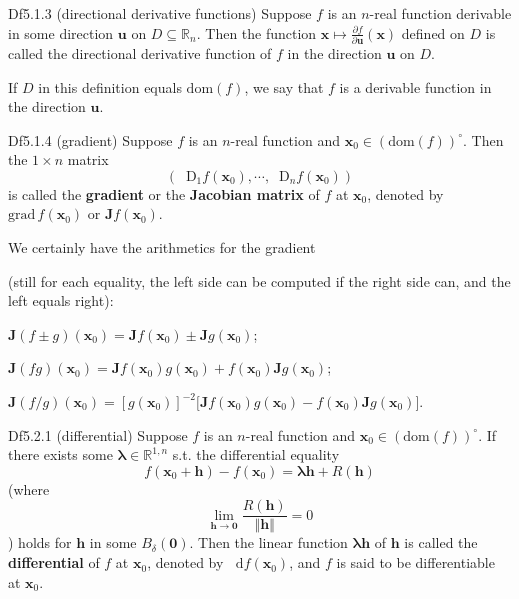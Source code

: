 \documentclass{article}
\newcommand{\parfrac}[2]{\frac{\partial #1}{\partial #2}}
\newcommand{\dif}{\mathop{}\!\mathrm{d}}
\newcommand{\Dif}{\mathop{}\!\mathrm{D}}
\begin{document}
\begin{Df}{Df5.1.3 (directional derivative functions)}
    Suppose $f$ is an $n$-real function derivable in some direction $\pmb{u}$ on $D\subseteq\mathbb{R}_n$. Then the function $\pmb{x}\mapsto \parfrac{f}{\pmb{u}}(\pmb{x})$ defined on $D$ is called the directional derivative function of $f$ in the direction $\pmb{u}$ on $D$.
\end{Df}

\begin{Rmk}{}
    \textcolor{Df}{If $D$ in this definition equals $\text{dom}(f)$, we say that $f$ is a derivable function in the direction $\pmb{u}$.}
\end{Rmk}

\begin{Df}{Df5.1.4 (gradient)}
    Suppose $f$ is an $n$-real function and $\pmb{x}_0\in (\text{dom}(f))^\circ$. Then the $1\times n$ matrix 
    $$(\Dif_1 f(\pmb{x}_0), \cdots, \Dif_n f(\pmb{x}_0))$$
    is called the \textbf{gradient} or the \textbf{Jacobian matrix} of $f$ at $\pmb{x}_0$, denoted by $\text{grad}\,f(\pmb{x}_0)$ or $\pmb{J}f(\pmb{x}_0)$.
\end{Df}

\begin{Rmk}{}
    We certainly have the arithmetics for the gradient \textcolor{Th}{(still for each equality, the left side can be computed if the right side can, and the left equals right): 
    \begin{compactenum}
        \item $\pmb{J}(f\pm g)(\pmb{x}_0) = \pmb{J}f(\pmb{x}_0)\pm\pmb{J}g(\pmb{x}_0)$;
        \item $\pmb{J}(fg)(\pmb{x}_0) = \pmb{J}f(\pmb{x}_0)g(\pmb{x}_0) + f(\pmb{x}_0)\pmb{J}g(\pmb{x}_0)$;
        \item $\pmb{J}(f/g)(\pmb{x}_0) = [g(\pmb{x}_0)]^{-2} \bigl[\pmb{J}f(\pmb{x}_0)g(\pmb{x}_0) - f(\pmb{x}_0)\pmb{J}g(\pmb{x}_0)\bigr]$.
    \end{compactenum}
    }
\end{Rmk}

\begin{Df}{Df5.2.1 (differential)}
    Suppose $f$ is an $n$-real function and $\pmb{x}_0\in (\text{dom}(f))^\circ$. If there exists some $\pmb{\lambda}\in\mathbb{R}^{1,n}$ s.t. the differential equality
    $$ f(\pmb{x}_0 + \pmb{h}) - f(\pmb{x}_0) = \pmb{\lambda}\pmb{h} + R(\pmb{h}) $$
    (where 
    $$\lim_{\pmb{h}\to \pmb{0}}\frac{R(\pmb{h})}{\Vert \pmb{h}\Vert} = 0 $$
    ) holds for $\pmb{h}$ in some $B_\delta(\pmb{0})$. Then the linear function $\pmb{\lambda h}$ of $\pmb{h}$ is called the \textbf{differential} of $f$ at $\pmb{x}_0$, denoted by $\dif f(\pmb{x}_0)$, and $f$ is said to be differentiable at $\pmb{x}_0$.
\end{Df}
\end{document}

